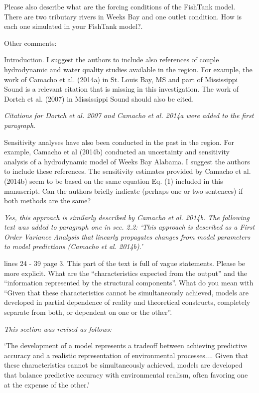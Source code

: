 \documentclass[letterpaper,12pt]{article}\usepackage[]{graphicx}\usepackage[]{color}
\begin{document}
Please also describe what are the forcing conditions of the FishTank model. There are two tributary rivers in Weeks Bay and one outlet condition. How is each one simulated in your FishTank model?.

Other comments:

Introduction. I suggest the authors to include also references of couple hydrodynamic and water quality studies available in the region. For example, the work of Camacho et al. (2014a) in St. Louis Bay, MS and part of Mississippi Sound is a relevant citation that is missing in this investigation. The work of Dortch et al. (2007) in Mississippi Sound should also be cited. 

{\it Citations for Dortch et al. 2007 and Camacho et al. 2014a were added to the first paragraph.}

Sensitivity analyses have also been conducted in the past in the region. For example, Camacho et al (2014b) conducted an uncertainty and sensitivity analysis of a hydrodynamic model of Weeks Bay Alabama. I suggest the authors to include these references. The sensitivity estimates provided by Camacho et al. (2014b) seem to be based on the same equation Eq. (1) included in this manuscript. Can the authors briefly indicate (perhaps one or two sentences) if both methods are the same?

{\it Yes, this approach is similarly described by Camacho et al. 2014b.  The following text was added to paragraph one in sec. 2.2: `This approach is described as a First Order Variance Analysis that linearly propagates changes from model parameters to model predictions (Camacho et al. 2014b).'}

lines 24 - 39 page 3. This part of the text is full of vague statements. Please be more explicit. What are the ``characteristics expected from the output'' and the ``information represented by the structural components''. What do you mean with ``Given that these characteristics cannot be simultaneously achieved, models are developed in partial dependence of reality and theoretical constructs, completely separate from both, or dependent on one or the other''.

{\it This section was revised as follows:

`The development of a model represents a tradeoff between achieving predictive accuracy and a realistic representation of environmental processes.... Given that these characteristics cannot be simultaneously achieved, models are developed that balance predictive accuracy with environmental realism, often favoring one at the expense of the other.'

}
\end{document}
